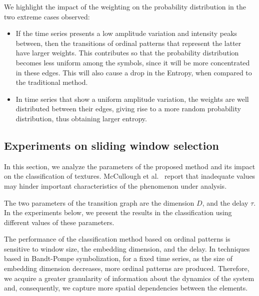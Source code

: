\documentclass[journal]{IEEEtran}
\begin{document}
We highlight the impact of the weighting on the probability distribution in the two extreme cases observed:
\begin{itemize}
	\item If the time series presents a low amplitude variation and intensity peaks between, then the transitions of ordinal patterns that represent the latter have larger weights.
	This contributes so that the probability distribution becomes less uniform among the symbols, since it will be more concentrated in these edges.
	This will also cause a drop in the Entropy, when compared to the traditional method.
	\item In time series that show a uniform amplitude variation, the weights are well distributed between their edges, giving rise to a more random probability distribution, thus obtaining larger entropy.
\end{itemize}




\subsection{Experiments on sliding window selection}

In this section, we analyze the parameters of the proposed method and its impact on the classification of textures.
McCullough et al.~\cite{mccullough2015time} report that inadequate values may hinder important characteristics of the phenomenon under analysis.

The two parameters of the transition graph are the dimension $D$, and the delay $\tau$.
In the experiments below, we present the results in the classification using different values of these parameters.

The performance of the classification method based on ordinal patterns is sensitive to window size, the embedding dimension, and the delay.
In techniques based in Bandt-Pompe symbolization, for a fixed time series, as the size of embedding dimension decreases, more ordinal patterns are produced.
Therefore, we acquire a greater granularity of information about the dynamics of the system and, consequently, we capture more spatial dependencies between the elements.
\end{document}
